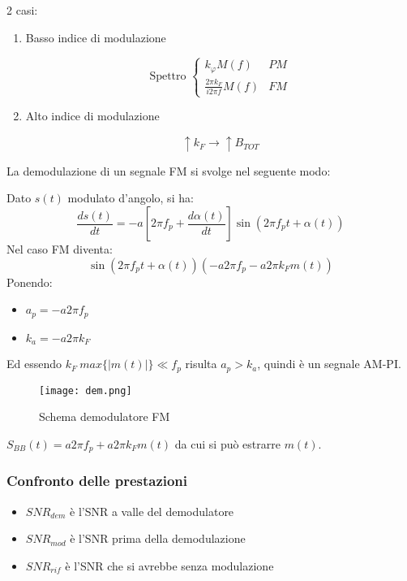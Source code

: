 \documentclass{article}
\begin{document}
\begin{itemize}
        2 casi:
            \begin{enumerate}
                \item Basso indice di modulazione

                    \[\text{Spettro }\begin{cases}
                        k_\varphi M(f) & PM\\
                        \frac{\displaystyle2\pi k_F}{\displaystyle i2\pi f}M(f) & FM
                    \end{cases}\]
                
                \item Alto indice di modulazione

                    $$\uparrow k_F\rightarrow\uparrow B_{TOT}$$\newline
                
            \end{enumerate}
\end{itemize}

\noindent La demodulazione di un segnale FM si svolge nel seguente modo:\newline

\noindent Dato $s(t)$ modulato d'angolo, si ha:
$$\frac{ds(t)}{dt}=-a[2\pi f_p+\frac{d\alpha(t)}{dt}]\sin(2\pi f_pt+\alpha(t))$$
\noindent Nel caso FM diventa:
$$\sin(2\pi f_pt+\alpha(t))(-a2\pi f_p-a2\pi k_Fm(t))$$
\noindent Ponendo:
\begin{itemize}
    \item $a_p=-a2\pi f_p$
    \item $k_a=-a2\pi k_F$
\end{itemize}
\noindent Ed essendo $k_F\ max\{|m(t)|\}\ll f_p$ risulta $a_p>k_a$, quindi è un segnale AM-PI.\newline

\begin{figure}[ht]
    \centering
    \texttt{[image: dem.png]}
    \caption{Schema demodulatore FM}
\end{figure}

\noindent $S_{BB}(t)=a2\pi f_p+a2\pi k_Fm(t)$ da cui si può estrarre $m(t)$.

\subsubsection{Confronto delle prestazioni}
\begin{itemize}
    \item $SNR_{dem}$ è l'SNR a valle del demodulatore
    \item $SNR_{mod}$ è l'SNR prima della demodulazione
    \item $SNR_{rif}$ è l'SNR che si avrebbe senza modulazione\newline
\end{itemize}
\end{document}
